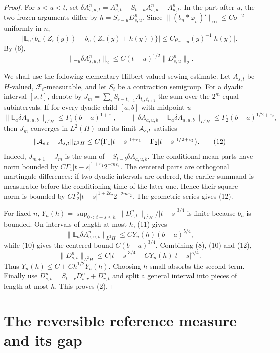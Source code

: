 \documentclass[12pt]{article}
\newcommand{\E}{\mathbb E}
\newcommand{\1}{\mathbf 1}
\newcommand{\calF}{\mathcal F}
\begin{document}
\begin{proof}
For \(s<u<t\), set
\(\delta A^n_{s,u,t}=A^n_{s,t}-S_{t-u}A^n_{s,u}-A^n_{u,t}\).  In the part
after \(u\), the two frozen arguments differ by \(h=S_{r-u}D^n_{s,u}\).
Since \(\|(b_n*\varphi_\sigma)'\|_\infty\le C\sigma^{-2}\) uniformly in \(n\),
\[
 \left|\E_u\{b_n(Z_r(y))-b_n(Z_r(y)+h(y))\}\right|
      \le C\rho_{r-u}(y)^{-1}|h(y)|.
\]
By (6),
\[
        \|\E_u\delta A^n_{s,u,t}\|_2
        \le C(t-u)^{1/2}\|D^n_{s,u}\|_2 .                    \tag{11}
\]

We shall use the following elementary Hilbert-valued sewing estimate.  Let
\(A_{s,t}\) be \(H\)-valued, \(\calF_t\)-measurable, and let
\(S_t\) be a contraction semigroup.  For a dyadic interval \([s,t]\), denote
by \(J_m=\sum_iS_{t-t_{i+1}}A_{t_i,t_{i+1}}\) the sum over the \(2^m\) equal
subintervals.  If for every dyadic child \([a,b]\) with midpoint \(u\)
\[
\|\E_a\delta A_{a,u,b}\|_{L^2H}\le \Gamma_1(b-a)^{1+\varepsilon_1},\qquad
\|\delta A_{a,u,b}-\E_a\delta A_{a,u,b}\|_{L^2H}
        \le \Gamma_2(b-a)^{1/2+\varepsilon_2},
\]
then \(J_m\) converges in \(L^2(H)\) and its limit \({\cal A}_{s,t}\) satisfies
\[
 \|{\cal A}_{s,t}-A_{s,t}\|_{L^2H}
 \le C\bigl(\Gamma_1|t-s|^{1+\varepsilon_1}
       +\Gamma_2|t-s|^{1/2+\varepsilon_2}\bigr).             \tag{12}
\]
Indeed, \(J_{m+1}-J_m\) is the sum of
\(-S_{t-b}\delta A_{a,u,b}\).  The conditional-mean parts have norm bounded by
\(C\Gamma_1|t-s|^{1+\varepsilon_1}2^{-m\varepsilon_1}\).  The centered parts
are orthogonal martingale differences: if two dyadic intervals are ordered,
the earlier summand is measurable before the conditioning time of the later
one.  Hence their square norm is bounded by
\(C\Gamma_2^2|t-s|^{1+2\varepsilon_2}2^{-2m\varepsilon_2}\).  The geometric
series gives (12).

For fixed \(n\), \(Y_n(h)=\sup_{0<t-s\le h}\|D^n_{s,t}\|_{L^2H}/|t-s|^{3/4}\)
is finite because \(b_n\) is bounded.  On intervals of length at most \(h\),
(11) gives
\[
 \|\E_a\delta A^n_{a,u,b}\|_{L^2H}\le C Y_n(h)(b-a)^{5/4},
\]
while (10) gives the centered bound \(C(b-a)^{3/4}\).  Combining (8), (10) and
(12),
\[
 \|D^n_{s,t}\|_{L^2H}\le C|t-s|^{3/4}
        +C Y_n(h)|t-s|^{5/4}.
\]
Thus \(Y_n(h)\le C+Ch^{1/2}Y_n(h)\).  Choosing \(h\) small absorbs the second
term.  Finally use
\(D^n_{s,t}=S_{t-r}D^n_{s,r}+D^n_{r,t}\) and split a general interval into
pieces of length at most \(h\).  This proves (2).
\end{proof}

\section*{The reversible reference measure and its gap}
\end{document}
